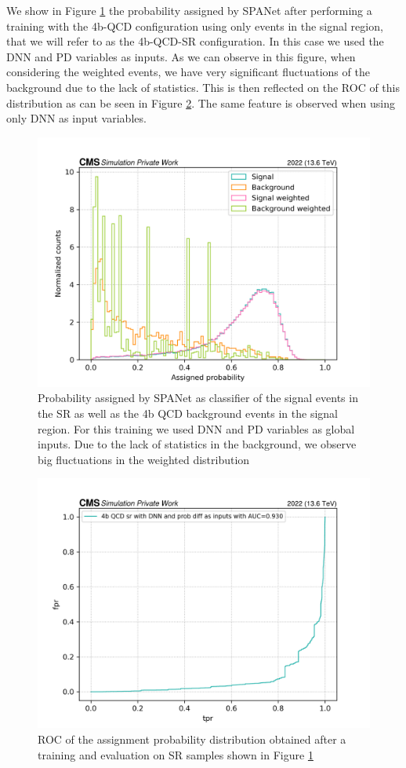 We show in Figure \ref{fig: Assigned prob 4b QCD SR} the probability assigned by SPANet after performing a training with the 4b-QCD configuration using only events in the signal region, that we will refer to as the 4b-QCD-SR configuration. In this case we used the DNN and PD variables as inputs. As we can observe in this figure, when considering the weighted events, we have very significant fluctuations of the background due to the lack of statistics. This is then reflected on the ROC of this distribution as can be seen in Figure \ref{fig: ROC of the assignment proba SR}.  The same feature is observed when using only DNN as input variables.

\begin{figure}[hbt]
    \centering
    \includegraphics[width=0.7\linewidth]{Images/7.S:B/SR stats/4b stats SR class output.png}
    \caption{Probability assigned by SPANet as classifier of the signal events in the SR as well as the 4b QCD background events in the signal region. For this training we used DNN and PD variables as global inputs. Due to the lack of statistics in the background, we observe big fluctuations in the weighted distribution}
    \label{fig: Assigned prob 4b QCD SR}
\end{figure}

\begin{figure}[hbt]
    \centering
    \includegraphics[width=0.7\linewidth]{Images/7.S:B/SR stats/ROC 4b QCD SR dnn proba.png}
    \caption{ROC of the assignment probability distribution obtained after a training and evaluation on SR samples shown in Figure \ref{fig: Assigned prob 4b QCD SR}}
    \label{fig: ROC of the assignment proba SR}
\end{figure}

